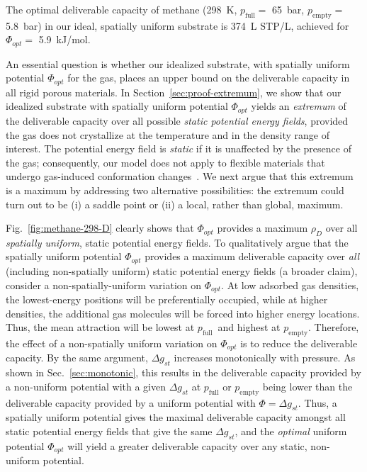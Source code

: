 \documentclass[twoside,twocolumn,9pt]{article}
\newcommand\V{\Phi}
\newcommand\pfull{\ensuremath{p_{\text{full}}}}
\newcommand\pempty{\ensuremath{p_{\text{empty}}}}
\newcommand\gst{\ensuremath{\Delta g_{st}}}
\begin{document}
The optimal deliverable capacity of methane (298\ K, $\pfull=$ 65\ bar,
$\pempty=$ 5.8\ bar) in our ideal, spatially uniform substrate is 374\ L STP/L,
achieved for $\V_{opt} =$ 5.9\ kJ/mol.

An essential question is whether our idealized substrate, with spatially
uniform potential $\V_{opt}$ for the gas, places an upper bound on the
deliverable capacity in all rigid porous materials. In
Section~\ref{sec:proof-extremum}, we show that our idealized substrate with
spatially uniform potential $\V_{opt}$ yields an \emph{extremum} of the
deliverable capacity over all possible \emph{static potential energy fields},
provided the gas does not crystallize at the temperature and in the density
range of interest. The potential energy field is \emph{static} if it is
unaffected by the presence of the gas; consequently, our model does not apply
to flexible materials that undergo gas-induced conformation
changes~\cite{schneemann2014flexible}. We next argue that this extremum is a
maximum by addressing two alternative possibilities: the extremum could turn
out to be (i) a saddle point or (ii) a local, rather than global, maximum.

Fig.~\ref{fig:methane-298-D} clearly shows that $\V_{opt}$ provides a maximum
$\rho_D$ over all \emph{spatially uniform}, static potential energy fields. To
qualitatively argue that the spatially uniform potential $\V_{opt}$ provides a
maximum deliverable capacity over \emph{all} (including non-spatially uniform)
static potential energy fields (a broader claim), consider a
non-spatially-uniform variation on $\V_{opt}$. 
At low adsorbed gas densities, the lowest-energy positions will be preferentially occupied, while
at higher densities, the additional gas molecules will be forced into higher
energy locations. Thus, the mean attraction will be lowest at \pfull\ and
highest at \pempty. 
Therefore, the effect of a non-spatially uniform variation on $\V_{opt}$ is to reduce the deliverable capacity.
By the same argument, $\gst$ increases monotonically with
pressure. As shown in Sec.~\ref{sec:monotonic}, this results in
the deliverable capacity provided by a non-uniform potential with a given $\gst$ at $\pfull$ or $\pempty$ being lower than the
deliverable capacity provided by a uniform potential with $\V=\gst$. Thus, a spatially uniform potential gives the maximal
deliverable capacity amongst all static potential energy fields that give the
same $\gst$, and the \emph{optimal} uniform potential $\V_{opt}$ will yield a
greater deliverable capacity over any static, non-uniform potential.
\end{document}

